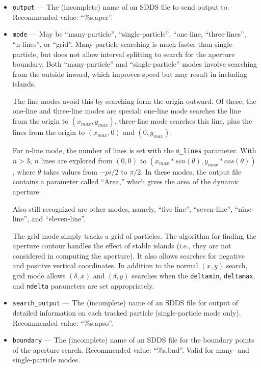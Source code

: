 \documentclass[11pt]{article}
\begin{document}
\begin{itemize}
\item \verb|output| --- The (incomplete) name of an SDDS file to send output to.  
 Recommended value: ``\%s.aper''.

\item \verb|mode| --- May be ``many-particle'', ``single-particle'', ``one-line, ``three-lines'', ``n-lines'', or
  ``grid''.
Many-particle searching is much faster than single-particle, but does not allow interval splitting to
search for the aperture boundary.  Both ``many-particle'' and ``single-particle'' modes involve searching from the outside inward,
which improves speed but may result in including islands.

The line modes avoid this by searching form the origin
outward.  Of these, the one-line and three-line modes are special:
one-line mode searches the line from the origin to $(x_{max},
y_{max})$.  three-line mode searches this line, plus the lines from
the origin to $(x_{max}, 0)$ and $(0, y_{max})$.  

For n-line mode, the number of lines is set with the \verb|n_lines| parameter.
With $n>3$, $n$ lines are explored from $(0,0)$ to
$(x_{max}*sin(\theta), y_{max}*cos(\theta))$, where $\theta$ takes
values from $-pi/2$ to $\pi/2$.   In these modes, the output file contains
a parameter called ``Area,'' which gives the area of the dynamic aperture.

Also still recognized are other modes, namely, ``five-line'', ``seven-line'', ``nine-line'',
and ``eleven-line''.

The grid mode simply tracks a grid of particles. The algorithm for finding the aperture contour 
handles the effect of stable islands (i.e., they are not considered in computing the aperture).
It also allows searches for negative and positive vertical coordinates.
In addition to the normal $(x, y)$ search, grid mode allows $(\delta, x)$ and $(\delta, y)$ searches
when the \verb|deltamin|, \verb|deltamax|, and \verb|ndelta| parameters are set appropriately.

\item \verb|search_output| --- The (incomplete) name of an SDDS file for output of detailed
 information on each tracked particle (single-particle mode only).  Recommended value:
 ``\%s.apso''.

\item \verb|boundary| --- The (incomplete) name of an SDDS 
file for the boundary points of the aperture search.  Recommended value: ``\%s.bnd''.
Valid for many- and single-particle modes.


\end{itemize}
\end{document}
